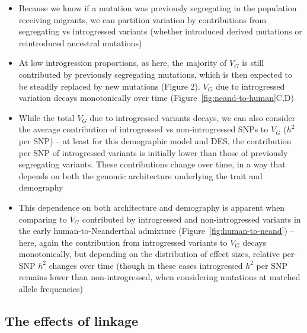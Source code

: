 \documentclass{article}
\begin{document}
\begin{itemize}
    \item Because we know if a mutation was previously segregating in the population
        receiving migrants, we can partition variation by contributions from
        segregating vs introgressed variants (whether introduced derived mutations
        or reintroduced ancestral mutations)
    \item At low introgression proportions, as here, the majority of $V_G$ is still
        contributed by previously segregating mutations, which is then expected to
        be steadily replaced by new mutations (Figure 2). $V_G$ due to introgressed
        variation decays monotonically over time (Figure~\ref{fig:neand-to-human}C,D)
    \item While the total $V_G$ due to introgressed variants decays, we can also
        consider the average contribution of introgressed vs non-introgressed SNPs
        to $V_G$ ($h^2$ per SNP) -- at least for this demographic model and
        DES, the contribution per SNP of introgressed variants is initially lower
        than those of previously segregating variants. These contributions change
        over time, in a way that depends on both the genomic architecture underlying
        the trait and demography
    \item This dependence on both architecture and demography is apparent when
        comparing to $V_G$ contributed by introgressed and non-introgressed variants
        in the early human-to-Neanderthal admixture (Figure~\ref{fig:human-to-neand})
        -- here, again the contribution
        from introgressed variants to $V_G$ decays monotonically, but depending on
        the distribution of effect sizes, relative per-SNP $h^2$ changes over time
        (though in these cases introgressed $h^2$ per SNP remains lower than
        non-introgressed, when considering mutations at matched allele frequencies)
\end{itemize}

\subsection*{The effects of linkage}
\end{document}

